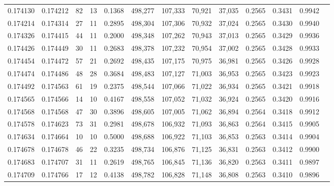 \begin{tabular}{rrrrrrrrrrrrr}
0.174130 & 0.174212 &    82 &  13 &                                     0.1368 & 498,277 & 107,333 &  70,921 &  37,035 & 0.2565 & 0.3431 & 0.9942 \\
0.174214 & 0.174314 &    27 &  11 &                                     0.2895 & 498,304 & 107,306 &  70,932 &  37,024 & 0.2565 & 0.3430 & 0.9940 \\
0.174326 & 0.174415 &    44 &  11 &                                     0.2000 & 498,348 & 107,262 &  70,943 &  37,013 & 0.2565 & 0.3429 & 0.9936 \\
0.174426 & 0.174449 &    30 &  11 &                                     0.2683 & 498,378 & 107,232 &  70,954 &  37,002 & 0.2565 & 0.3428 & 0.9933 \\
0.174454 & 0.174472 &    57 &  21 &                                     0.2692 & 498,435 & 107,175 &  70,975 &  36,981 & 0.2565 & 0.3426 & 0.9928 \\
0.174474 & 0.174486 &    48 &  28 &                                     0.3684 & 498,483 & 107,127 &  71,003 &  36,953 & 0.2565 & 0.3423 & 0.9923 \\
0.174492 & 0.174563 &    61 &  19 &                                     0.2375 & 498,544 & 107,066 &  71,022 &  36,934 & 0.2565 & 0.3421 & 0.9918 \\
0.174565 & 0.174566 &    14 &  10 &                                     0.4167 & 498,558 & 107,052 &  71,032 &  36,924 & 0.2565 & 0.3420 & 0.9916 \\
0.174568 & 0.174568 &    47 &  30 &                                     0.3896 & 498,605 & 107,005 &  71,062 &  36,894 & 0.2564 & 0.3418 & 0.9912 \\
0.174578 & 0.174623 &    73 &  31 &                                     0.2981 & 498,678 & 106,932 &  71,093 &  36,863 & 0.2564 & 0.3415 & 0.9905 \\
0.174634 & 0.174664 &    10 &  10 &                                     0.5000 & 498,688 & 106,922 &  71,103 &  36,853 & 0.2563 & 0.3414 & 0.9904 \\
0.174678 & 0.174678 &    46 &  22 &                                     0.3235 & 498,734 & 106,876 &  71,125 &  36,831 & 0.2563 & 0.3412 & 0.9900 \\
0.174683 & 0.174707 &    31 &  11 &                                     0.2619 & 498,765 & 106,845 &  71,136 &  36,820 & 0.2563 & 0.3411 & 0.9897 \\
0.174709 & 0.174766 &    17 &  12 &                                     0.4138 & 498,782 & 106,828 &  71,148 &  36,808 & 0.2563 & 0.3410 & 0.9896 \\

\end{tabular}

